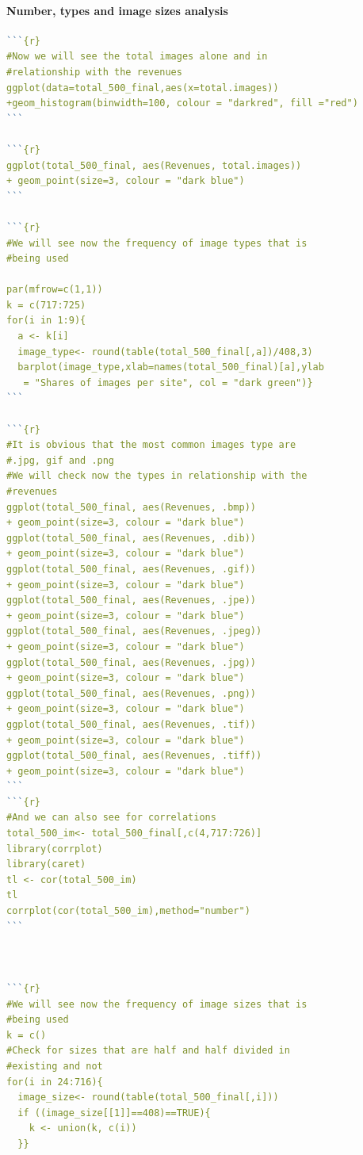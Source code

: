 \documentclass{article}
\begin{document}
\paragraph{Number, types and image sizes analysis}\label{r: van: img}
\begin{lstlisting}[language=R]  
```{r}
#Now we will see the total images alone and in 
#relationship with the revenues
ggplot(data=total_500_final,aes(x=total.images))
+geom_histogram(binwidth=100, colour = "darkred", fill ="red")
```

```{r}
ggplot(total_500_final, aes(Revenues, total.images)) 
+ geom_point(size=3, colour = "dark blue")
```

```{r}
#We will see now the frequency of image types that is 
#being used

par(mfrow=c(1,1))
k = c(717:725)
for(i in 1:9){
  a <- k[i]
  image_type<- round(table(total_500_final[,a])/408,3)
  barplot(image_type,xlab=names(total_500_final)[a],ylab
   = "Shares of images per site", col = "dark green")}
```

```{r}
#It is obvious that the most common images type are 
#.jpg, gif and .png
#We will check now the types in relationship with the 
#revenues
ggplot(total_500_final, aes(Revenues, .bmp)) 
+ geom_point(size=3, colour = "dark blue")
ggplot(total_500_final, aes(Revenues, .dib)) 
+ geom_point(size=3, colour = "dark blue")
ggplot(total_500_final, aes(Revenues, .gif)) 
+ geom_point(size=3, colour = "dark blue")
ggplot(total_500_final, aes(Revenues, .jpe)) 
+ geom_point(size=3, colour = "dark blue")
ggplot(total_500_final, aes(Revenues, .jpeg)) 
+ geom_point(size=3, colour = "dark blue")
ggplot(total_500_final, aes(Revenues, .jpg)) 
+ geom_point(size=3, colour = "dark blue")
ggplot(total_500_final, aes(Revenues, .png)) 
+ geom_point(size=3, colour = "dark blue")
ggplot(total_500_final, aes(Revenues, .tif)) 
+ geom_point(size=3, colour = "dark blue")
ggplot(total_500_final, aes(Revenues, .tiff)) 
+ geom_point(size=3, colour = "dark blue")
```
```{r}
#And we can also see for correlations
total_500_im<- total_500_final[,c(4,717:726)]
library(corrplot)
library(caret)
tl <- cor(total_500_im)
tl
corrplot(cor(total_500_im),method="number")
```



```{r}
#We will see now the frequency of image sizes that is 
#being used
k = c()
#Check for sizes that are half and half divided in 
#existing and not
for(i in 24:716){
  image_size<- round(table(total_500_final[,i]))
  if ((image_size[[1]]==408)==TRUE){
    k <- union(k, c(i))
  }}


\end{lstlisting}
\end{document}
